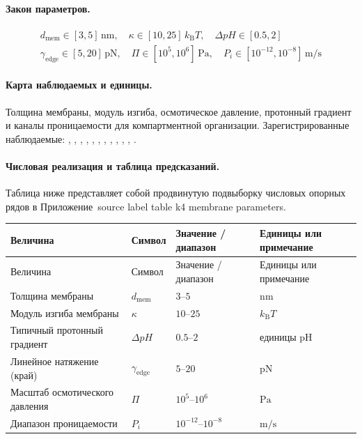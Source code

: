 \paragraph{Закон параметров.}
\[
\begin{gathered} d_{\mathrm{mem}} \in [3, 5]\,\mathrm{nm},\quad \kappa \in [10, 25]\,k_{\mathrm{B}}T,\quad \Delta pH \in [0.5, 2] \\ \gamma_{\mathrm{edge}} \in [5,20]\,\mathrm{pN},\quad \Pi \in [10^5,10^6]\,\mathrm{Pa},\quad P_i \in [10^{-12},10^{-8}]\,\mathrm{m/s} \end{gathered}
\]

\paragraph{Карта наблюдаемых и единицы.}
Толщина мембраны, модуль изгиба, осмотическое давление, протонный градиент и каналы проницаемости для компартментной организации.
Зарегистрированные наблюдаемые: , \allowbreak {}, \allowbreak {}, \allowbreak {}, \allowbreak {}, \allowbreak {}, \allowbreak {}, \allowbreak {}, \allowbreak {}, \allowbreak {}, \allowbreak {}, \allowbreak {}.

\paragraph{Числовая реализация и таблица предсказаний.}
Таблица ниже представляет собой продвинутую подвыборку числовых опорных рядов в Приложение~source label table k4 membrane parameters.
\begin{longtable}{@{}L{0.27\textwidth}L{0.15\textwidth}L{0.24\textwidth}L{0.16\textwidth}@{}}
\toprule
Величина & Символ & Значение / диапазон & Единицы или примечание \\
\midrule
\endfirsthead
\toprule
Величина & Символ & Значение / диапазон & Единицы или примечание \\
\midrule
\endhead
Толщина мембраны & $\scriptstyle d_{\mathrm{mem}}$ & $3\text{--}5$ & $\mathrm{nm}$ \\
Модуль изгиба мембраны & $\scriptstyle \kappa$ & $10\text{--}25$ & $k_{\mathrm{B}}T$ \\
Типичный протонный градиент & $\scriptstyle \Delta pH$ & $0.5\text{--}2$ & единицы pH \\
Линейное натяжение (край) & $\scriptstyle \gamma_{\mathrm{edge}}$ & $5\text{--}20$ & $\mathrm{pN}$ \\
Масштаб осмотического давления & $\scriptstyle \Pi$ & $10^5\text{--}10^6$ & $\mathrm{Pa}$ \\
Диапазон проницаемости & $\scriptstyle P_i$ & $10^{-12}\text{--}10^{-8}$ & $\mathrm{m/s}$ \\
\bottomrule
\end{longtable}

